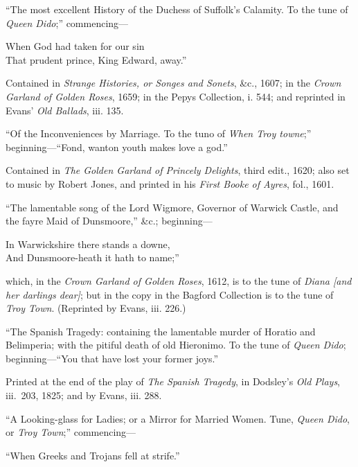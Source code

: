 “The most excellent History of the Duchess of Suffolk’s Calamity. To the
tune of \textit{Queen Dido};” commencing—
\settowidth{\versewidth}{That prudent prince, King Edward, away.”}
\begin{scverse}
When God had taken for our sin\\
\vin That prudent prince, King Edward, away.”
\end{scverse}
Contained in \textit{Strange Histories, or Songes and Sonets}, \&c., 1607; in the \textit{Crown
Garland of Golden Roses}, 1659; in the Pepys Collection, i. 544; and reprinted
in Evans’ \textit{Old Ballads}, iii. 135.

“Of the Inconveniences by Marriage. To the tuno of \textit{When Troy towne};”
beginning—\qquad\qquad “Fond, wanton youth makes love a god.”

\noindent Contained in \textit{The Golden Garland of Princely Delights}, third edit., 1620; also
set to music by Robert Jones, and printed in his \textit{First Booke of Ayres}, fol., 1601.

“The lamentable song of the Lord Wigmore, Governor of Warwick Castle,
and the fayre Maid of Dunsmoore,” \&c.; beginning—
\settowidth{\versewidth}{In Warwickshire there stands a downe,}
\begin{scverse}
In Warwickshire there stands a downe,\\
And Dunsmoore-heath it hath to name;”
\end{scverse}
which, in the \textit{Crown Garland of Golden Roses}, 1612, is to the tune of \textit{Diana [and
her darlings dear]}; but in the copy in the Bagford Collection is to the tune of
\textit{Troy Town}. (Reprinted by Evans, iii. 226.)

“The Spanish Tragedy: containing the lamentable murder of Horatio and
Belimperia; with the pitiful death of old Hieronimo. To the tune of \textit{Queen
Dido}; beginning—\qquad\qquad “You that have lost your former joys.”

\noindent Printed at the end of the play of \textit{The Spanish Tragedy}, in Dodsley’s \textit{Old Plays},
iii.~203, 1825; and by Evans, iii. 288.

“A Looking-glass for Ladies; or a Mirror for Married Women. Tune, \textit{Queen
Dido}, or \textit{Troy Town};” commencing—
\settowidth{\versewidth}{“When Greeks and Trojans fell at strife.”}
\begin{scverse}
“When Greeks and Trojans fell at strife.”
\end{scverse}
\pagebreak%

